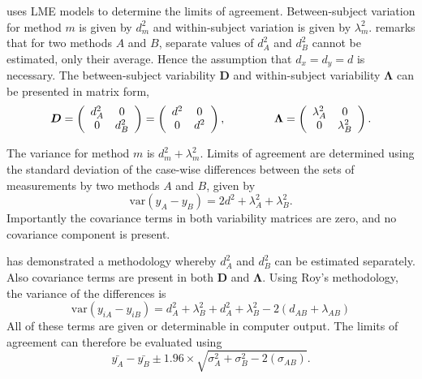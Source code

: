 \documentclass[12pt, a4paper]{report}
\theoremstyle{plain}
\theoremstyle{definition}
\theoremstyle{remark}
\begin{document}
\citet{BXC2008} uses LME models to determine the limits of agreement. Between-subject variation for method $m$ is given by $d^2_{m}$ and within-subject variation is given by $\lambda^2_{m}$.  \citet{BXC2008} remarks that for two methods $A$ and $B$, separate values of $d^2_{A}$ and $d^2_{B}$ cannot be estimated, only their average. Hence the assumption that $d_{x}= d_{y}= d$ is necessary. The between-subject variability $\boldsymbol{D}$ and within-subject variability $\boldsymbol{\Lambda}$ can be presented in matrix form,\[
\boldsymbol{D} = \left(%
\begin{array}{cc}
d^2_{A}& 0 \\
0 & d^2_{B} \\
\end{array}%
\right)=\left(%
\begin{array}{cc}
d^2& 0 \\
0 & d^2\\
\end{array}%
\right),
\hspace{1.5cm}
\boldsymbol{\Lambda} = \left(%
\begin{array}{cc}
\lambda^2_{A}& 0 \\
0 & \lambda^2_{B} \\
\end{array}%
\right).
\]

The variance for method $m$ is $d^2_{m}+\lambda^2_{m}$. Limits of agreement are determined using the standard deviation of the case-wise differences between the sets of measurements by two methods $A$ and $B$, given by
\begin{equation}
\mbox{var} (y_{A}-y_{B}) = 2d^2 + \lambda^2_{A}+ \lambda^2_{B}.
\end{equation}
Importantly the covariance terms in both variability matrices are zero, and no covariance component is present.


\citet{ARoy2009} has demonstrated a methodology whereby $d^2_{A}$ and $d^2_{B}$ can be estimated separately. Also covariance terms are present in both $\boldsymbol{D}$ and $\boldsymbol{\Lambda}$. Using Roy's methodology, the variance of the differences is
\begin{equation}
\mbox{var} (y_{iA}-y_{iB})= d^2_{A} + \lambda^2_{B} + d^2_{A} + \lambda^2_{B} - 2(d_{AB} + \lambda_{AB})
\end{equation}
All of these terms are given or determinable in computer output.
The limits of agreement can therefore be evaluated using
\begin{equation}
\bar{y_{A}}-\bar{y_{B}} \pm 1.96 \times \sqrt{ \sigma^2_{A} + \sigma^2_{B}  - 2(\sigma_{AB})}.
\end{equation}
\end{document}
